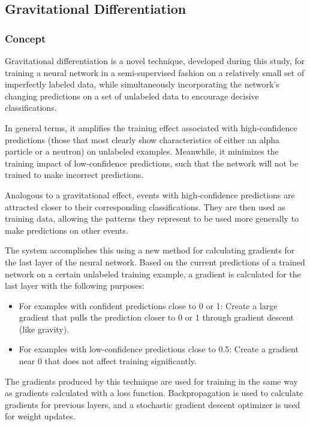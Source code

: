 \documentclass[10pt]{article}
\begin{document}
\subsection{Gravitational Differentiation}

\subsubsection{Concept}

Gravitational differentiation is a novel technique, developed during this study, for training a neural network in a semi-supervised fashion on a relatively small set of imperfectly labeled data, while simultaneously incorporating the network's changing predictions on a set of unlabeled data to encourage decisive classifications.

In general terms, it amplifies the training effect associated with high-confidence predictions (those that most clearly show characteristics of either an alpha particle or a neutron) on unlabeled examples. Meanwhile, it minimizes the training impact of low-confidence predictions, such that the network will not be trained to make incorrect predictions.

Analogous to a gravitational effect, events with high-confidence predictions are attracted closer to their corresponding classifications. They are then used as training data, allowing the patterns they represent to be used more generally to make predictions on other events.

The system accomplishes this using a new method for calculating gradients for the last layer of the neural network. Based on the current predictions of a trained network on a certain unlabeled training example, a gradient is calculated for the last layer with the following purposes:

\begin{itemize}
    \item For examples with confident predictions close to 0 or 1: Create a large gradient that pulls the prediction closer to 0 or 1 through gradient descent (like gravity).
    \item For examples with low-confidence predictions close to 0.5: Create a gradient near 0 that does not affect training significantly.
\end{itemize}

The gradients produced by this technique are used for training in the same way as gradients calculated with a loss function. Backpropagation is used to calculate gradients for previous layers, and a stochastic gradient descent optimizer is used for weight updates.
\end{document}
